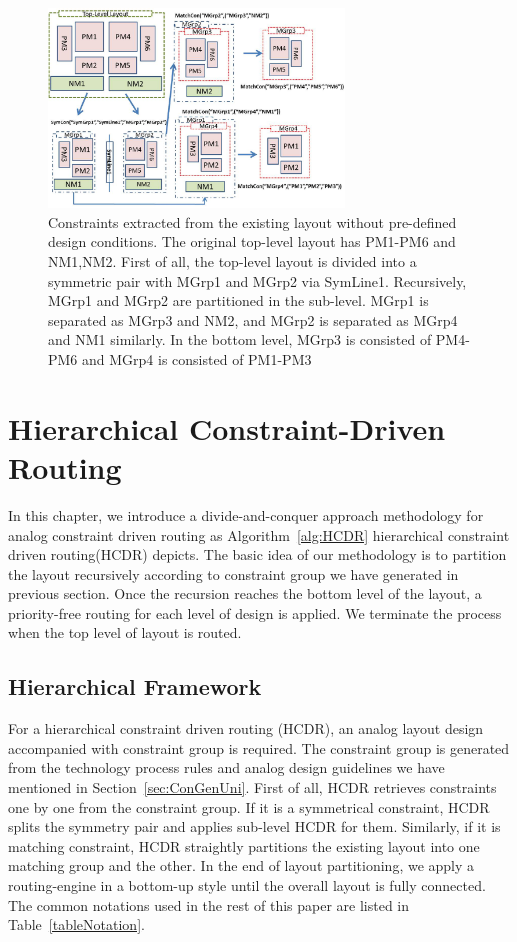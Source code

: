       \begin{figure}[ht]
        \centering
        \includegraphics[width=0.7\textwidth]{Fig/Chapter3/CGExtract.eps}
        \caption{Constraints extracted from the existing layout without pre-defined design conditions. The original top-level layout has PM1-PM6 and NM1,NM2. First of all, the top-level layout is divided into a symmetric pair with MGrp1 and MGrp2 via SymLine1. Recursively, MGrp1 and MGrp2 are partitioned in the sub-level. MGrp1 is separated as MGrp3 and NM2, and MGrp2 is separated as MGrp4 and NM1 similarly. In the bottom level, MGrp3 is consisted of PM4-PM6 and MGrp4 is consisted of PM1-PM3}
        \label{fig:CGExtract}
      \end{figure}

  \section{Hierarchical Constraint-Driven Routing}\label{sec:HCDR}

    In this chapter, we introduce a divide-and-conquer approach methodology for analog constraint driven routing as Algorithm~\ref{alg:HCDR} hierarchical constraint driven routing(HCDR) depicts. The basic idea of our methodology is to partition the layout recursively according to constraint group we have generated in previous section. Once the recursion reaches the bottom level of the layout, a priority-free routing for each level of design is applied. We terminate the process when the top level of layout is routed. 

    \subsection{Hierarchical Framework}\label{sec:HierFramework}

      For a hierarchical constraint driven routing (HCDR), an analog layout design accompanied with constraint group is required. The constraint group is generated from the technology process rules and analog design guidelines we have mentioned in Section~\ref{sec:ConGenUni}. First of all, HCDR retrieves constraints one by one from the constraint group. If it is a symmetrical constraint, HCDR splits the symmetry pair and applies sub-level HCDR for them. Similarly, if it is matching constraint, HCDR straightly partitions the existing layout into one matching group and the other. In the end of layout partitioning, we apply a routing-engine in a bottom-up style until the overall layout is fully connected. The common notations used in the rest of this paper are listed in Table~\ref{tableNotation}.

